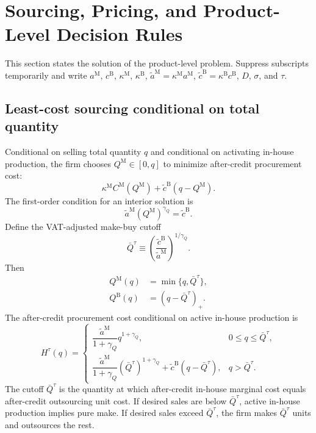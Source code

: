 \documentclass[11pt,a4paper]{article}
\newcommand{\M}{\mathrm{M}}
\newcommand{\B}{\mathrm{B}}
\begin{document}
\section{Sourcing, Pricing, and Product-Level Decision Rules}

This section states the solution of the product-level problem. Suppress subscripts temporarily and write $a^{\M}$, $c^{\B}$, $\kappa^{\M}$, $\kappa^{\B}$, $\widetilde a^{\M}=\kappa^{\M}a^{\M}$, $\widetilde c^{\B}=\kappa^{\B}c^{\B}$, $D$, $\sigma$, and $\tau$.

\subsection{Least-cost sourcing conditional on total quantity}

Conditional on selling total quantity $q$ and conditional on activating in-house production, the firm chooses $Q^{\M}\in[0,q]$ to minimize after-credit procurement cost:
\begin{equation}
    \kappa^{\M}C^{\M}(Q^{\M})+\widetilde c^{\B}(q-Q^{\M}).
    \label{eq:least_cost}
\end{equation}
The first-order condition for an interior solution is
\begin{equation}
    \widetilde a^{\M}(Q^{\M})^{\gamma_Q}=\widetilde c^{\B}.
\end{equation}
Define the VAT-adjusted make-buy cutoff
\begin{equation}
    \bar Q^{\tau}
    \equiv
    \left(\frac{\widetilde c^{\B}}{\widetilde a^{\M}}\right)^{1/\gamma_Q}.
    \label{eq:qbar}
\end{equation}
Then
\begin{align}
    Q^{\M}(q)&=\min\{q,\bar Q^{\tau}\},
    \label{eq:make_qty_conditional}\\
    Q^{\B}(q)&=(q-\bar Q^{\tau})_+.
    \label{eq:buy_qty_conditional}
\end{align}
The after-credit procurement cost conditional on active in-house production is
\begin{equation}
    H^{\tau}(q)=
    \begin{cases}
        \dfrac{\widetilde a^{\M}}{1+\gamma_Q}q^{1+\gamma_Q},
        & 0\leq q\leq\bar Q^{\tau},\\[0.9em]
        \dfrac{\widetilde a^{\M}}{1+\gamma_Q}(\bar Q^{\tau})^{1+\gamma_Q}
        +\widetilde c^{\B}(q-\bar Q^{\tau}),
        & q>\bar Q^{\tau}.
    \end{cases}
    \label{eq:H_piecewise}
\end{equation}
The cutoff $\bar Q^{\tau}$ is the quantity at which after-credit in-house marginal cost equals after-credit outsourcing unit cost. If desired sales are below $\bar Q^{\tau}$, active in-house production implies pure make. If desired sales exceed $\bar Q^{\tau}$, the firm makes $\bar Q^{\tau}$ units and outsources the rest.
\end{document}

